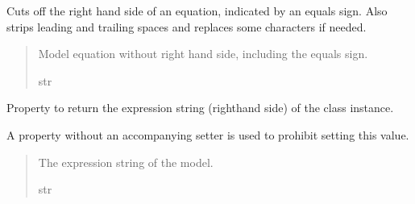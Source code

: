 \documentclass[letterpaper,10pt,english]{sphinxmanual}
\begin{document}
\begin{fulllineitems}

\begin{fulllineitems}
\label{\detokenize{VPCModel:src.VPCModel.VPCModel.cut_off_rhs}}
\pysigstartsignatures
{}
\pysigstopsignatures
\sphinxAtStartPar
Cuts off the right hand side of an equation, indicated by an equals sign.
Also strips leading and trailing spaces and replaces some characters if needed.
\begin{quote}\begin{description}
\sphinxAtStartPar
Model equation without right hand side, including the equals sign.

\sphinxAtStartPar
str

\end{description}\end{quote}

\end{fulllineitems}


\begin{fulllineitems}
\label{\detokenize{VPCModel:src.VPCModel.VPCModel.expression_string}}
\pysigstartsignatures
{}
\pysigstopsignatures
\sphinxAtStartPar
Property to return the expression string (right\sphinxhyphen{}hand side) of the class instance.

\sphinxAtStartPar
A property without an accompanying setter is used to prohibit setting this value.
\begin{quote}\begin{description}
\sphinxAtStartPar
The expression string of the model.

\sphinxAtStartPar
str

\end{description}\end{quote}

\end{fulllineitems}



\end{fulllineitems}
\end{document}
